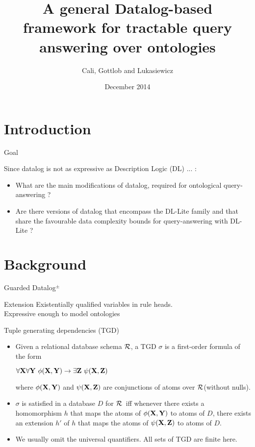 \documentclass{beamer}
\title[SWANS-Dec2014]{A general Datalog-based framework for tractable query answering over ontologies}
\author[Mirian Halfeld Ferrari]{Cali, Gottlob and Lukasiewicz}
\institute[LIFO]{Main Ideas of the paper}
\date{December 2014}
\def\R{\hbox{${\cal{R}}$}}
\begin{document}
\begin{frame}
  \titlepage
 \end{frame}
 
 \small
 \section{Introduction}
 
 \begin{frame}{Goal}
 \begin{block}{Since datalog is not as expressive as Description Logic (DL) ... :}
 \begin{itemize}
 \item  What are the main modifications of datalog, required for ontological query-answering ?
 \item Are there versions of datalog that encompass the DL-Lite family and that share the favourable data complexity bounds for query-answering with DL-Lite ?
 \end{itemize}

 \end{block} 

\end{frame}
 
 
 \section{Background}
 
 \begin{frame}{Guarded Datalog$^\pm$}
 \begin{block}{Extension}
 Existentially  qualified variables in rule heads.\\
 Expressive enough to model ontologies
  \end{block}
  
  
  \begin{block}{Tuple generating dependencies (TGD)}
  \begin{itemize}
  \item  Given a relational database schema \R, a TGD  $\sigma$ is a first-order formula of the form
  
  \centerline{$\forall \bf{X} \forall \bf{Y} ~\phi(\bf{X}, \bf{Y})  \rightarrow \exists \bf{Z} ~\psi (\bf{X}, \bf{Z})$}
  
  where $\phi(\bf{X}, \bf{Y})$  and  $\psi (\bf{X}, \bf{Z})$  are conjunctions of atoms over \R (without nulls).
  \item $\sigma$ is satisfied  in a database $D$ for \R\ iff whenever there exists a homomorphism $h$ that maps the atoms of $\phi(\bf{X}, \bf{Y})$
  to atoms of $D$, there exists an extension $h'$ of  $h$ that maps the atoms of  $\psi (\bf{X}, \bf{Z})$ to atoms of $D$.
  \item  We usually omit the universal quantifiers. All sets of TGD are finite here.
  
  \end{itemize}
  
  \end{block}
 
 \end{frame}
 
\end{document}
